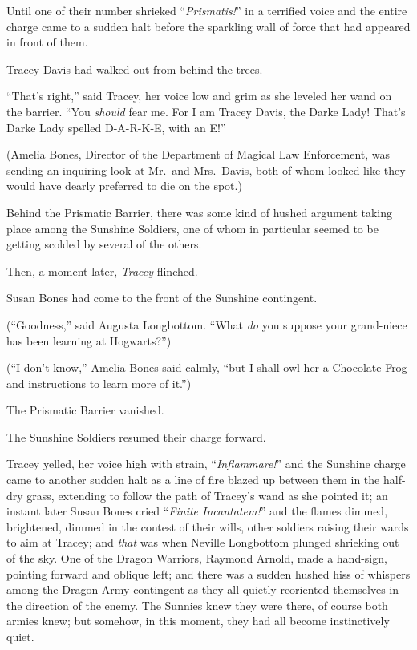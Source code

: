 Until one of their number shrieked “\emph{Prismatis!}” in a
terrified voice and the entire charge came to a sudden halt before
the sparkling wall of force that had appeared in front of them.

Tracey Davis had walked out from behind the trees.

“That’s right,” said Tracey, her voice low and grim as she
leveled her wand on the barrier. “You \emph{should} fear me. For I
am Tracey Davis, the Darke Lady! That’s Darke Lady spelled
D-A-R-K-E, with an E!”

(Amelia Bones, Director of the Department of Magical Law
Enforcement, was sending an inquiring look at Mr.~and Mrs.~Davis,
both of whom looked like they would have dearly preferred to die on
the spot.)

Behind the Prismatic Barrier, there was some kind of hushed
argument taking place among the Sunshine Soldiers, one of whom in
particular seemed to be getting scolded by several of the
others.

Then, a moment later, \emph{Tracey} flinched.

Susan Bones had come to the front of the Sunshine
contingent.

(“Goodness,” said Augusta Longbottom. “What \emph{do} you
suppose your grand-niece has been learning at Hogwarts?”)

(“I don’t know,” Amelia Bones said calmly, “but I shall owl her
a Chocolate Frog and instructions to learn more of it.”)

The Prismatic Barrier vanished.

The Sunshine Soldiers resumed their charge forward.

Tracey yelled, her voice high with strain, “\emph{Inflammare!}”
and the Sunshine charge came to another sudden halt as a line of
fire blazed up between them in the half-dry grass, extending to
follow the path of Tracey’s wand as she pointed it; an instant
later Susan Bones cried “\emph{Finite Incantatem!}” and the flames
dimmed, brightened, dimmed in the contest of their wills, other
soldiers raising their wards to aim at Tracey; and \emph{that} was
when Neville Longbottom plunged shrieking out of the sky.
\sbreak
One of the Dragon Warriors, Raymond Arnold, made a hand-sign,
pointing forward and oblique left; and there was a sudden hushed
hiss of whispers among the Dragon Army contingent as they all
quietly reoriented themselves in the direction of the enemy. The
Sunnies knew they were there, of course both armies knew; but
somehow, in this moment, they had all become instinctively
quiet.

